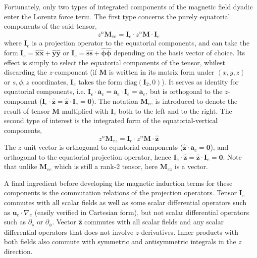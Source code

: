 Fortunately, only two types of integrated components of the magnetic field dyadic enter the Lorentz force term. The first type concerns the purely equatorial components of the said tensor, 
\[
    z^n \mathbf{M}_{ee} = \mathbf{I}_e \cdot z^n \mathbf{M}\cdot \mathbf{I}_e
\]
where $\mathbf{I}_e$ is a projection operator to the equatorial components, and can take the form $\mathbf{I}_e = \hat{\mathbf{x}}\hat{\mathbf{x}} + \hat{\mathbf{y}}\hat{\mathbf{y}}$ or $\mathbf{I}_e = \hat{\mathbf{s}}\hat{\mathbf{s}} + \hat{\bm{\phi}}\hat{\bm{\phi}}$ depending on the basis vector of choice. Its effect is simply to select the equatorial components of the tensor, whilest discarding the $z$-component (if $\mathbf{M}$ is written in its matrix form under $(x,y,z)$ or $s,\phi,z$ coordinates, $\mathbf{I}_e$ takes the form $\mathrm{diag}(\mathbf{I}_2, 0)$). 
It serves as identity for equatorial components, i.e. $\mathbf{I}_e\cdot \mathbf{a}_e = \mathbf{a}_e\cdot \mathbf{I}_e = \mathbf{a}_e$, but is orthogonal to the $z$-component ($\mathbf{I}_e\cdot \hat{\mathbf{z}} = \hat{\mathbf{z}}\cdot \mathbf{I}_e = \mathbf{0}$).
The notation $\mathbf{M}_{ee}$ is introduced to denote the result of tensor $\mathbf{M}$ multiplied with $\mathbf{I}_e$ both to the left and to the right. 
The second type of interest is the integrated form of the equatorial-vertical components, 
\[
    z^n \mathbf{M}_{ez} = \mathbf{I}_e \cdot z^n \mathbf{M} \cdot \hat{\mathbf{z}}
\]
The $z$-unit vector is orthogonal to equatorial components ($\hat{\mathbf{z}}\cdot \mathbf{a}_e = \mathbf{0}$), and orthogonal to the equatorial projection operator, hence $\mathbf{I}_e\cdot \hat{\mathbf{z}} = \hat{\mathbf{z}} \cdot \mathbf{I}_e = \mathbf{0}$. Note that unlike $\mathbf{M}_{ee}$ which is still a rank-2 tensor, here $\mathbf{M}_{ez}$ is a vector.

A final ingredient before developing the magnetic induction terms for these components is the commutation relations of the projection operators. Tensor $\mathbf{I}_e$ commutes with all scalar fields as well as some scalar differential operators such as $\mathbf{u}_e \cdot \nabla_e$ (easily verified in Cartesian form), but not scalar differential operators such as $\partial_s$ or $\partial_\phi$. Vector $\hat{\mathbf{z}}$ commutes with all scalar fields and any scalar differential operators that does not involve $z$-derivatives. Inner products with both fields also commute with symmetric and antisymmetric integrals in the $z$ direction.

